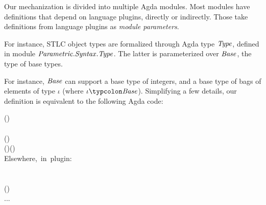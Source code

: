 Our mechanization is divided into multiple Agda modules. Most
modules have definitions that depend on language plugins,
directly or indirectly. Those take definitions from language
plugins as \emph{module parameters}.

For instance, STLC object types are formalized through Agda type
\ensuremath{\Conid{Type}}, defined in module \ensuremath{\Conid{\Conid{Parametric}.\Conid{Syntax}.Type}}. The latter is
parameterized over \ensuremath{\Conid{Base}}, the type of base types.

For instance, \ensuremath{\Conid{Base}} can support a base type of integers, and a
base type of bags of elements of type \ensuremath{\iota} (where \ensuremath{\iota\typcolon\Conid{Base}}). Simplifying a few details, our definition is equivalent
to the following Agda code:
\begin{hscode}\SaveRestoreHook
{}%
%
%
%
%
%
%
%
%
%
%
%
\>[B]{}\;\;(\typcolon{})\;\<[E]%
\\
\>[B]{}\<[3]%
\>[3]{}\;\typcolon{}\;\<[E]%
\\
\>[3]{}\<[5]%
\>[5]{}\<[11]%
\>[11]{}\typcolon{}\<[11E]%
\>[14]{}\;(\iota\typcolon{}){}\<[48]%
\>[48]{}\to {}\<[E]%
\\
\>[3]{}\<[5]%
\>[5]{}\text{\textunderscore}\mathord{\Rightarrow}\text{\textunderscore}{}\<[11]%
\>[11]{}\typcolon{}\<[11E]%
\>[14]{}\;(\sigma\typcolon{}){}\<[32]%
\>[32]{}\to (\tau\typcolon{})\to {}\<[E]%
\\[\blanklineskip]%
\>[B]{}\mbox{\onelinecomment  Elsewhere, in plugin:}{}\<[E]%
\\[\blanklineskip]%
\>[B]{}\;\typcolon{}\;\<[E]%
\\
\>[B]{}\<[3]%
\>[3]{}\<[12]%
\>[12]{}\typcolon{}\<[12E]%
\>[15]{}\;\<[E]%
\\
\>[B]{}\<[3]%
\>[3]{}\<[12]%
\>[12]{}\typcolon{}\<[12E]%
\>[15]{}\;(\iota\typcolon{})\to {}\<[E]%
\\
\>[B]{}\mbox{\onelinecomment  ...}{}\<[E]%
\ColumnHook
\end{hscode}\resethooks

